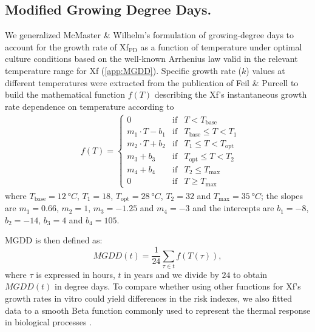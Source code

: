     \subsection{Modified Growing Degree Days.} We generalized McMaster \&
    Wilhelm’s
    \cite{McMaster1997} formulation of growing-degree days to account for the
    growth rate of Xf$_{\textrm{PD}}$ as a function of temperature under
    optimal
    culture conditions based on the well-known Arrhenius law valid in the
    relevant
    temperature range for Xf (\cref{app:MGDD}). Specific growth rate
    ($k$) values at different temperatures were extracted from the publication
    of
    Feil \& Purcell \cite{Feil2001} to build the mathematical function $f(T)$
    describing the Xf’s instantaneous growth rate dependence on temperature
    according to
    \begin{align*}
         & f(T)=\left\{\begin{array}{lll}
                           0                & \textrm{if} & T<T_{\textrm{base}}
                           \\
                           m_1\cdot T-b_1   & \textrm{if} & T_{\textrm{base}}
                           \leq T < T_1
                           \\
                           m_2\cdot T + b_2 & \textrm{if} & T_{1} \leq T <
                           T_{\textrm{opt}}
                           \\
                           m_3 + b_3        & \textrm{if} & T_{\textrm{opt}}
                           \leq T < T_2
                           \\
                           m_4 + b_4        & \textrm{if} & T_2 \leq
                           T_{\textrm{max}}
                           \\
                           0                & \textrm{if} & T\geq
                           T_{\textrm{max}}
                       \end{array}\right. \,
    \end{align*}
    where $T_{\textrm{base}}=\SI{12}{\degree C}$, $T_1=18$,
$T_{\textrm{opt}}=\SI{28}{\degree C}$,	$T_2=32$ and
$T_{\textrm{max}}=\SI{35}{\degree C}$; the slopes are $m_1= 0.66$, $m_2=1$,
$m_3=-1.25$ and $m_4=-3$ and the intercepts are $b_1=-8$, $b_2=-14$, $b_3=4$
    and $b_4=105$.

    MGDD is then defined as:
    \begin{equation}\label{eq:MGDD_def}
        MGDD(t) = \frac{1}{24}\sum_{\tau \in t} f(T(\tau)),
    \end{equation}
    where $\tau$ is expressed in hours, $t$ in years and we divide by $24$ to
    obtain $MGDD(t)$ in degree days. To compare whether using other functions
    for
    Xf's growth rates in vitro could yield differences in the risk indexes, we
    also
    fitted data to a smooth Beta function commonly used to represent the
    thermal
    response in biological processes \cite{Yan1999,Magarey2005}.

